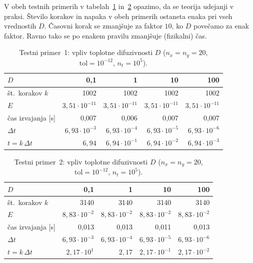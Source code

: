 \documentclass[a4paper,11pt]{article}
\begin{document}
	V obeh testnih primerih v tabelah~\ref{tab:D1} in~\ref{tab:D2} opazimo, da se teorija udejanji v praksi. Število korakov in napaka v obeh primerih ostaneta enaka pri vseh vrednostih $D$. Časovni korak se zmanjšuje za faktor $10$, ko $D$ povečamo za enak faktor. Ravno tako se po enakem pravilu zmanjšuje (fizikalni) čas.
	
	\begin{table}[htbp]
		\centering
		\begin{tabular}{lrrrr}
			\toprule
			$D$                  & 0{,}1                    & 1                        & 10                       & 100                      \\
			\midrule
			št.\ korakov $k$     & 1002                     & 1002                     & 1002                     & 1002                     \\
			$E$                  & $3{,}51 \cdot 10^{-11}$ & $3{,}51 \cdot 10^{-11}$ & $3{,}51 \cdot 10^{-11}$ & $3{,}51 \cdot 10^{-11}$ \\
			čas izvajanja [s]    & 0{,}007                  & 0{,}006                  & 0{,}007                  & 0{,}007                  \\
			$\Delta t$           & $6{,}93 \cdot 10^{-3}$  & $6{,}93 \cdot 10^{-4}$  & $6{,}93 \cdot 10^{-5}$  & $6{,}93 \cdot 10^{-6}$  \\
			$t = k\,\Delta t$    & $6{,}94$                 & $6{,}94 \cdot 10^{-1}$  & $6{,}94 \cdot 10^{-2}$  & $6{,}94 \cdot 10^{-3}$  \\
			\bottomrule
		\end{tabular}
		\caption{Testni primer~1: vpliv toplotne difuzivnosti $D$ ($n_x = n_y = 20$, $\text{tol} = 10^{-12}$, $n_t = 10^5$).}
		\label{tab:D1}
	\end{table}
	
	\begin{table}[htbp]
		\centering
		\begin{tabular}{lrrrr}
			\toprule
			$D$                  & 0{,}1                    & 1                        & 10                       & 100                      \\
			\midrule
			št.\ korakov $k$     & 3140                     & 3140                     & 3140                     & 3140                     \\
			$E$                  & $8{,}83 \cdot 10^{-2}$  & $8{,}83 \cdot 10^{-2}$  & $8{,}83 \cdot 10^{-2}$  & $8{,}83 \cdot 10^{-2}$  \\
			čas izvajanja [s]    & 0{,}013                  & 0{,}013                  & 0{,}011                  & 0{,}013                  \\
			$\Delta t$           & $6{,}93 \cdot 10^{-3}$  & $6{,}93 \cdot 10^{-4}$  & $6{,}93 \cdot 10^{-5}$  & $6{,}93 \cdot 10^{-6}$  \\
			$t = k\,\Delta t$    & $2{,}17 \cdot 10^{1}$   & $2{,}17$                 & $2{,}17 \cdot 10^{-1}$  & $2{,}17 \cdot 10^{-2}$  \\
			\bottomrule
		\end{tabular}
		\caption{Testni primer~2: vpliv toplotne difuzivnosti $D$ ($n_x = n_y = 20$, $\text{tol} = 10^{-12}$, $n_t = 10^5$).}
		\label{tab:D2}
	\end{table}
	
\end{document}

